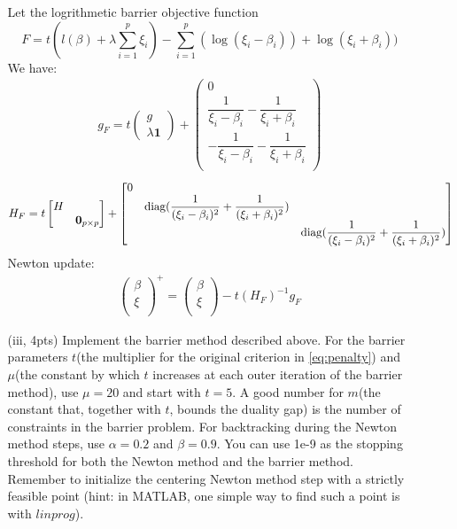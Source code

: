 \documentclass{article}
\theoremstyle{remark}
\theoremstyle{definition}
\newcommand{\diag}{\mathop{\rm diag}}
\begin{document}
\begin{enumerate}[(a)]
\begin{enumerate}
{	    Let the logrithmetic barrier objective function
	    \[F=t(l(\beta) + \lambda\sum_{i=1}^p \xi_i)-\sum_{i=1}^p(\log(\xi_i-\beta_i))+\log(\xi_i+\beta_i))\]
	    We have:
	    \begin{align*}
	        g_F =
	        t\begin{pmatrix}
	        g \\
	        \lambda \mathbf{1}
	        \end{pmatrix}
	        +
	        \begin{pmatrix}
	        0 \\
	        \dfrac{1}{\xi_i-\beta_i} - \dfrac{1}{\xi_i+\beta_i}\\
	         - \dfrac{1}{\xi_i-\beta_i} - \dfrac{1}{\xi_i+\beta_i}\\
	        \end{pmatrix}
	    \end{align*}
	    \begin{align*}
	        H_F =
	        t\begin{bmatrix}
	        H &  \\
	         & \mathbf{0}_{p\times p} \\
	        \end{bmatrix}+
	        \begin{bmatrix}
	        0 & &\\
	         & \diag(\dfrac{1}{(\xi_i-\beta_i)^2}+\dfrac{1}{(\xi_i+\beta_i)^2}) & \\
	         & & \diag(\dfrac{1}{(\xi_i-\beta_i)^2}+\dfrac{1}{(\xi_i+\beta_i)^2}) \\
	        \end{bmatrix}
	    \end{align*}
	    Newton update:
	    \begin{align*}
	        \begin{pmatrix}
	        \beta \\
	        \xi \\
	        \end{pmatrix}^+ = 
	        \begin{pmatrix}
	        \beta \\
	        \xi \\
	        \end{pmatrix} - t (H_F)^{-1}g_F
	    \end{align*}
	    }
	    \item[(iii, 4pts)] Implement the barrier method described above. For the barrier parameters $t$(the multiplier for the original criterion in \eqref{eq:penalty}) and $\mu$(the constant by which $t$ increases at each outer iteration of the barrier method), use $\mu=20$ and start with $t=5$. A good number for $m$(the constant that, together with $t$, bounds the duality gap) is the number of constraints in the barrier problem. For backtracking during the Newton method steps, use $\alpha=0.2$ and $\beta=0.9$. You can use 1e-9 as the stopping threshold for both the Newton method and the barrier method. Remember to initialize the centering Newton method step with a strictly feasible point (hint: in MATLAB, one simple way to find such a point is with $linprog$).
    

\end{enumerate}
\end{enumerate}
\end{document}
